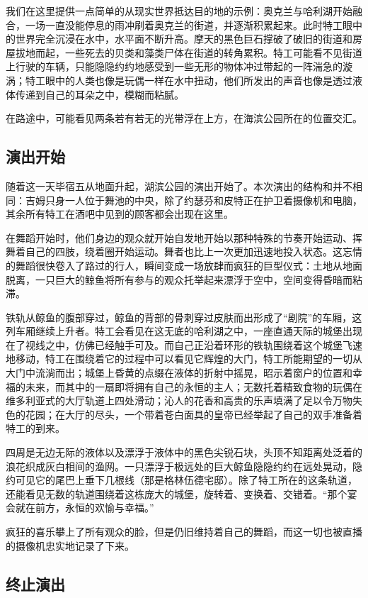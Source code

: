我们在这里提供一点简单的从现实世界抵达目的地的示例：奥克兰与哈利湖开始融合，一场一直没能停息的雨冲刷着奥克兰的街道，并逐渐积累起来。此时特工眼中的世界完全沉浸在水中，水平面不断升高。摩天的黑色巨石撑破了破旧的街道和房屋拔地而起，一些死去的贝类和藻类尸体在街道的转角累积。特工可能看不见街道上行驶的车辆，只能隐隐约约地感受到一些无形的物体冲过带起的一阵湍急的漩涡；特工眼中的人类也像是玩偶一样在水中扭动，他们所发出的声音也像是透过液体传递到自己的耳朵之中，模糊而粘腻。

在路途中，可能看见两条若有若无的光带浮在上方，在海滨公园所在的位置交汇。

\subsection{演出开始}

随着这一天毕宿五从地面升起，湖滨公园的演出开始了。本次演出的结构和并不相同：吉姆只身一人位于舞池的中央，除了约瑟芬和皮特正在护卫着摄像机和电脑，其余所有特工在酒吧中见到的顾客都会出现在这里。

在舞蹈开始时，他们身边的观众就开始自发地开始以那种特殊的节奏开始运动、挥舞着自己的四肢，绕着圈开始运动。舞者也比上一次更加迅速地投入状态。这忘情的舞蹈很快卷入了路过的行人，瞬间变成一场放肆而疯狂的巨型仪式：土地从地面脱离，一只巨大的鲸鱼将所有参与的观众托举起来漂浮于空中，空间变得昏暗而粘滞。

铁轨从鲸鱼的腹部穿过，鲸鱼的背部的骨刺穿过皮肤而出形成了“剧院”的车厢，这列车厢继续上升者。特工会看见在这无底的哈利湖之中，一座直通天际的城堡出现在了视线之中，仿佛已经触手可及。而自己正沿着环形的铁轨围绕着这个城堡飞速地移动，特工在围绕着它的过程中可以看见它辉煌的大门，特工所能期望的一切从大门中流淌而出；城堡上昏黄的点缀在液体的折射中摇晃，昭示着窗户的位置和幸福的未来，而其中的一扇即将拥有自己的永恒的主人；无数托着精致食物的玩偶在维多利亚式的大厅轨道上四处滑动；沁人的花香和高贵的乐声填满了足以令万物失色的花园；在大厅的尽头，一个带着苍白面具的皇帝已经举起了自己的双手准备着特工的到来。

四周是无边无际的液体以及漂浮于液体中的黑色尖锐石块，头顶不知距离处泛着的浪花织成灰白相间的渔网。一只漂浮于极远处的巨大鲸鱼隐隐约约在远处晃动，隐约可见它的尾巴上垂下几根线（那是格林伍德宅邸）。除了特工所在的这条轨道，还能看见无数的轨道围绕着这栋庞大的城堡，旋转着、变换着、交错着。“那个宴会就在前方，永恒的欢愉与幸福。”

疯狂的喜乐攀上了所有观众的脸，但是仍旧维持着自己的舞蹈，而这一切也被直播的摄像机忠实地记录了下来。

\subsection{终止演出}

